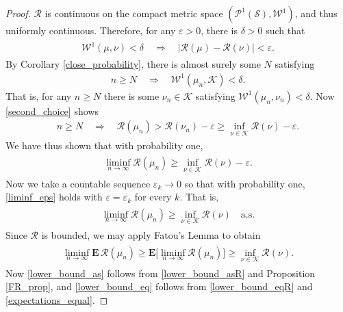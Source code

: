 \documentclass[11pt,reqno]{amsart}
\numberwithin{equation}{section}
\theoremstyle{definition}
\begin{document}
\begin{proof}
${\mathcal{R}}$ is continuous on the compact metric space $({\mathcal{P}}^1({\mathcal{S}}),{\mathcal{W}}^1)$, and thus uniformly continuous.
Therefore, for any ${\varepsilon} > 0$, there is $\delta > 0$ such that
{\begin{align} \begin{split} {
{\mathcal{W}}^1(\mu,\nu) < \delta \quad \Rightarrow \quad |{\mathcal{R}}(\mu) - {\mathcal{R}}(\nu)| < {\varepsilon}. \label{second_choice}
} \end{split} \end{align}}
By Corollary \ref{close_probability}, there is almost surely some $N$ satisfying
{\begin{align*} {
n \geq N \quad \Rightarrow \quad {\mathcal{W}}^1(\mu_{n},{\mathcal{K}}) < \delta.
} \end{align*}}
That is, for any $n \geq N$ there is some $\nu_n \in {\mathcal{K}}$ satisfying ${\mathcal{W}}^1(\mu_{n},\nu_n) < \delta$.
Now \eqref{second_choice} shows
{\begin{align*} {
n \geq N \quad \Rightarrow \quad {\mathcal{R}}(\mu_{n}) > {\mathcal{R}}(\nu_n) - {\varepsilon} \geq \inf_{\nu \in {\mathcal{K}}} {\mathcal{R}}(\nu) - {\varepsilon}.
} \end{align*}}
We have thus shown that with probability one,
{\begin{align} \begin{split} {
\liminf_{n \to \infty} {\mathcal{R}}(\mu_n) \geq \inf_{\nu \in {\mathcal{K}}} {\mathcal{R}}(\nu) - {\varepsilon}. \label{liminf_eps}
} \end{split} \end{align}}
Now we take a countable sequence ${\varepsilon}_k \to 0$ so that with probability one, \eqref{liminf_eps} holds with ${\varepsilon} = {\varepsilon}_k$ for every $k$.
That is,
{\begin{align} \begin{split} {
\liminf_{n \to \infty} {\mathcal{R}}(\mu_{n}) \geq \inf_{\nu \in {\mathcal{K}}} {\mathcal{R}}(\nu) \quad \mathrm{a.s.} \label{lower_bound_asR}
} \end{split} \end{align}}
Since ${\mathcal{R}}$ is bounded, we may apply Fatou's Lemma to obtain
{\begin{align} \begin{split} {
\liminf_{n \to \infty} {\mathbf{E}}\, {\mathcal{R}}(\mu_n) \geq {\mathbf{E}}\Big[\liminf_{n \to \infty} {\mathcal{R}}(\mu_{n})\Big] \geq \inf_{\nu \in {\mathcal{K}}} {\mathcal{R}}(\nu). \label{lower_bound_eqR}
} \end{split} \end{align}}
Now \eqref{lower_bound_as} follows from \eqref{lower_bound_asR} and Proposition \ref{FR_prop}, and \eqref{lower_bound_eq} follows from \eqref{lower_bound_eqR} and \eqref{expectations_equal}.
\end{proof}
\end{document}
